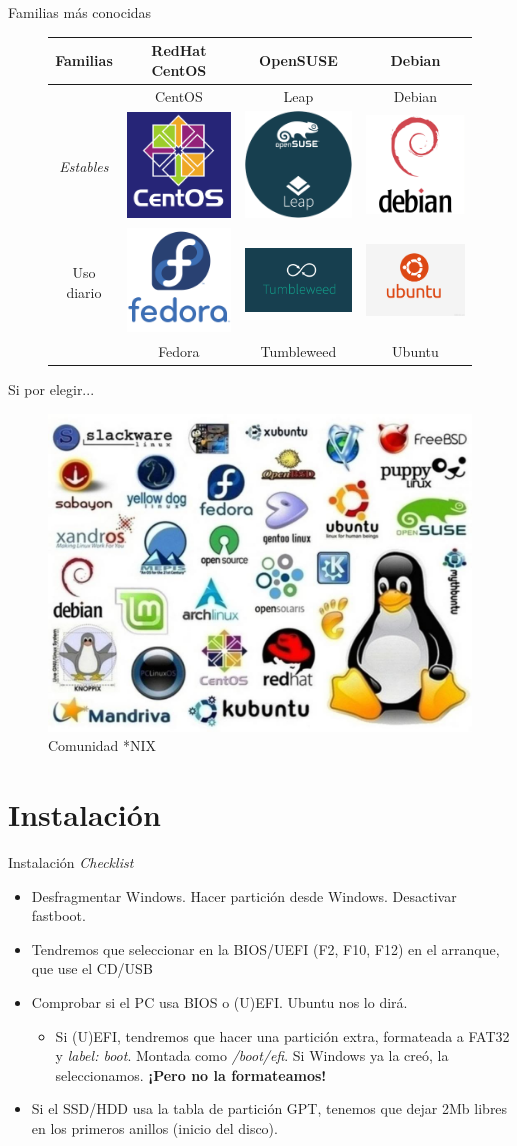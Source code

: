 \documentclass[12pt]{beamer}
\begin{document}
\begin{frame}{Familias más conocidas}
\vspace*{-2em}
\begin{figure}
	\begin{tabular}{cccc}
		Familias & RedHat \newline CentOS & OpenSUSE & Debian \\ \hline
		& CentOS & Leap & Debian \\ 
		\textit{Estables} &\includegraphics[scale=0.3]{centos_logo_blue} & \includegraphics[scale=0.16]{leap-500-500x500} & \includegraphics[scale=0.07]{Debian-Logo-Vector}\\
		\small Uso diario \normalsize & \includegraphics[scale=0.01]{fedora-logo} & \includegraphics[scale=0.6]{opensuse-tumbleweed-logo} & \includegraphics[scale=0.07]{logo-ubuntu} \\ 
		& Fedora & Tumbleweed & Ubuntu
	\end{tabular}
\end{figure}
\end{frame}

\begin{frame}{Si por elegir...}
	\begin{figure}
		\centering
		\includegraphics[width=0.77\linewidth]{distros-1024x768}
		\caption{Comunidad *NIX}
\end{figure}
	
\end{frame}

\section{Instalación}
\begin{frame}{Instalación}
	\textit{Checklist}
	\begin{itemize}
		\item Desfragmentar Windows. Hacer partición desde Windows. Desactivar fastboot.
		\item Tendremos que seleccionar en la BIOS/UEFI (F2, F10, F12) en el arranque, que use el CD/USB
		\item Comprobar si el PC usa BIOS o (U)EFI. Ubuntu nos lo dirá.
		\begin{itemize}
			\item Si (U)EFI, tendremos que hacer una partición extra, formateada a FAT32 y \textit{label: boot}. Montada como \textit{/boot/efi}. Si Windows ya la creó, la seleccionamos. \textbf{¡Pero no la formateamos!}
		\end{itemize}
		\item Si el SSD/HDD usa la tabla de partición GPT, tenemos que dejar 2Mb libres en los primeros anillos (inicio del disco).
	\end{itemize}
\end{frame}

\begin{frame}{Posibles problemas}
	$\bullet$ \textbf{Gráfic
\end{frame}
\end{document}
